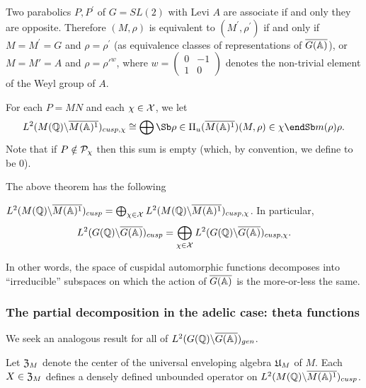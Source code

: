 \begin{example}
Two parabolics $P,P^{\prime }$ of $G=SL(2)$ with Levi $A$
are associate if and only they are opposite.
Therefore $(M,\rho )$ is equivalent to $(M^{\prime },\rho ^{\prime })$
if and only if $M=M^{\prime }=G$ and $\rho =\rho ^{\prime }$
(as equivalence classes of representations of
$\overline{G({\Bbb{A}})}$),
or $M=M'=A$ and $\rho ={\rho'}^w$, where 
$w=
\left(
\begin{array}{cc}
0 &-1\\
1&0
\end{array}
\right)$
denotes the non-trivial element of the Weyl group of $A$.
\end{example}

For each $P=MN$ and each $\chi \in {\cal X}$, we let 
\begin{equation}
L^2(M({{\Bbb{Q}}})\backslash \overline{M({\Bbb{A}})^1})_{cusp,\chi }
\cong
\bigoplus\Sb \rho \in \Pi _u(\overline{M({\Bbb{A}})^1})  \\
(M,\rho )\in \chi  \endSb
m(\rho )\rho .
\end{equation}
Note that if $P\notin {\cal P}_\chi $ then this sum is empty (which, by
convention, we define to be $0$).

The above theorem has the following

\begin{corollary}
$L^2(M({\Bbb{Q}})\backslash \overline{M({\Bbb{A}})^1})_{cusp}
=\bigoplus_{\chi \in {\cal X}}
L^2(M({\Bbb{Q}})\backslash \overline{M({\Bbb{A}})^1})_{cusp,\chi }$.
In particular, 
\[
L^2(G({\Bbb{Q}})\backslash \overline{G({\Bbb{A}})})_{cusp}
=\bigoplus_{\chi \in {\cal X}}
L^2(G({\Bbb{Q}})\backslash \overline{G({\Bbb{A}})})_{cusp,\chi }.
\]
\end{corollary}

In other words, the space of cuspidal automorphic functions decomposes into
``irreducible'' subspaces on which the action of $\overline{G({\Bbb{A}})}$ is the
more-or-less the same.

\subsubsection{The partial decomposition in the adelic case: theta functions}

We seek an analogous result for all of
$L^2(G({\Bbb{Q}})\backslash \overline{G({\Bbb{A}})})_{gen}$.

Let ${\frak{Z}}_M$ denote the center of the
universal enveloping algebra ${\frak{U}}_M$ of $M$. Each
$X\in {\frak{Z}}_M$ defines a densely defined
unbounded operator on
$L^2(M({\Bbb{Q}})\backslash \overline{M({\Bbb{A}})^1})_{cusp}$.

